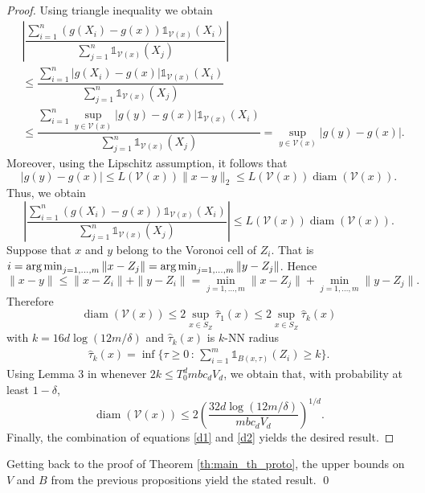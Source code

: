 \documentclass[paper=a4, fontsize=11pt]{scrartcl}
\newcommand{\diam}{\operatorname{diam}}
\newcommand{\argmin}{\operatornamewithlimits{\arg\min}}
\newcommand{\ind}{\mathds{1}}
\begin{document}
\begin{proof}
Using triangle inequality we obtain
    \begin{align*}
     &\left|  \dfrac{\sum_{i=1}^n \left(g(X_i) - g(x)\right) \ind_{ \mathcal V(x) }(X_i)}{\sum_{j=1}^n \ind_{ \mathcal V(x) }(X_j)} \right|\\ 
     &\leq \dfrac{\sum_{i=1}^n \left|g(X_i) - g(x)\right| \ind_{ \mathcal V(x) }(X_i)}{\sum_{j=1}^n \ind_{ \mathcal V(x) }(X_j)} \\ 
     &\leq \dfrac{\sum_{i=1}^n \sup_{y \in \mathcal V(x)} |g(y) - g(x)| \ind_{ \mathcal V(x) }(X_i)}{\sum_{j=1}^n \ind_{ \mathcal V(x) }(X_j)} = \sup_{y \in \mathcal V(x)} |g(y) - g(x)|.
\end{align*}
Moreover, using the Lipschitz assumption, it follows that
$$|g(y) - g(x)| \leq  L(\mathcal V(x)) \|x-y\|_2  \leq L(\mathcal V(x)) \diam  (\mathcal V(x) ).$$
Thus, we obtain
\begin{equation}\label{d1}
     \left|  \dfrac{\sum_{i=1}^n \left(g(X_i) - g(x)\right) \ind_{ \mathcal V(x) }(X_i)}{\sum_{j=1}^n \ind_{ \mathcal V(x) }(X_j)} \right| \leq L(\mathcal{V}(x)) \diam (\mathcal V (x) ).
\end{equation}
Suppose that $x$ and $y$ belong to the Voronoi cell of $Z_i$. That is $ i = \argmin _{j=1,\ldots, m} \| x- Z_j\| = \argmin_{j=1,\ldots, m} \| y- Z_j\| $. Hence 
$$\|x- y\| \leq  \| x- Z_i \| + \| y-Z_i\|=
\min_{j=1,\ldots, m}  \| x- Z_j \| + \min_{j=1,\ldots, m} \| y-Z_j\|.$$
Therefore 
$$  \diam (\mathcal V (x) ) \leq 2 \sup_{x\in S_Z} \hat \tau_1 (x) \leq 2 \sup_{x\in S_Z} \hat \tau_{k} (x) $$
with $k=16d \log(12m/\delta)$ and $\hat \tau_{k} (x) $ is $k$-NN radius 
\begin{align*}
\hat \tau_{k}(x) =  \inf   \{ \tau\geq 0 \, :\,  \sum_{i=1}^m \ind _{ B(x,\tau) }(Z_i) \geq k \} .
\end{align*}
Using Lemma 3 in \cite{portier2021nearest} whenever $2k \leq  T_0^d  m b c_d V_d$, we obtain that, with probability at least $1-\delta$,
\begin{equation}\label{d2}
   \diam (\mathcal V (x) ) \leq  2 \left(\frac{ 32d \log(12m/\delta) }{ mb c_d V_d }  \right)^{1/d}. 
\end{equation}
Finally, the combination of equations \eqref{d1} and \eqref{d2} yields the desired result.   
\end{proof}

Getting back to the proof of Theorem \ref{th:main_th_proto}, the upper bounds on \( V \) and \( B \) from the previous propositions yield the stated result.
\qed
\end{document}
